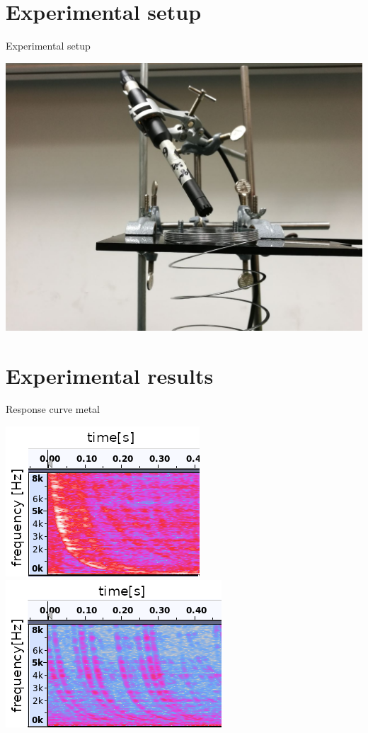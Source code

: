 \documentclass{beamer}
\begin{document}
\section {Experimental setup}
	\begin{frame}{Experimental setup}
	\begin{center}
		\includegraphics [scale=0.22]{images/better_setup_1.jpg}
	\end{center}
	\end{frame}


\section {Experimental results}
	\begin{frame}{Response curve metal}
		\begin{center}
		
		\includegraphics [scale=0.7]{images/echo_1_axies.png}
		\includegraphics [scale=0.7]{images/echo_2_axies.png}
		\end{center}
	\end{frame}
	
\end{document}
